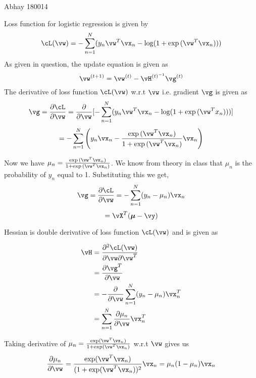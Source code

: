 \documentclass[a4paper,11pt]{article}
\begin{document}
{Abhay}   %
{180014}	%

\begin{mlsolution}
Loss function for logistic regression is given by
\[\cL(\vw) = - \sum_{n=1}^{N}(y_n\vw^T\vx_n - \log(1 + \exp{(\vw^T\vx_n)}))  \]
As given in question, the update equation is given as 
\[\vw^{(t+1)}=\vw^{(t)} - \vH^{(t)^{-1}}\vg^{(t)} \]
The derivative of loss function $\cL(\vw)$ w.r.t $\vw$ i.e. gradient $\vg$ is given as
\[\vg= \frac{\partial\cL}{\partial\vw}  = \frac{\partial}{\partial \vw} [ - \sum_{n=1}^{N}(y_n\vw^T\vx_n - \log(1 + \exp{(\vw^Tx_n)}))] \]
\[= - \sum_{n=1}^{N} \left( y_n\vx_n - \frac{\exp{(\vw^T\vx_n)}}{1+\exp{(\vw^T\vx_n)}} \vx_n\right)\]

Now we have $\mu_n = \frac{\exp{(\vw^T\vx_n)}}{1+\exp{(\vw^T\vx_n)}} $.  We know from theory in class that $\mu_n$ is the probability of $y_n$ equal to 1. Substituting this we get,
\[\vg = \frac{\partial\cL}{\partial\vw} = - \sum_{n=1}^{N}(y_n-\mu_n)\vx_n\]
\[= \vX^T(\boldsymbol{\mu} - \vy)\]

Hessian is double derivative of loss function $\cL(\vw)$ and is given as 

    
\begin{equation}
\begin{split}
    \vH & = \frac{\partial^2\cL(\vw)}{\partial\vw\partial\vw^T}\\
& = \frac{\partial\vg^T}{\partial\vw}\\
& = -\frac{\partial}{\partial\vw}\sum_{n=1}^{N}(y_n-\mu_n)\vx_n^{T}\\
 & = \sum_{n=1}^{N}\frac{\partial\mu_n}{\partial\vw}\vx_n^{T}
\end{split}
\end{equation}


Taking derivative of $\mu_n = \frac{\exp(\vw^T\vx_n)}{1+\exp(\vw^T\vx_n)} $ w.r.t $\vw$ gives us 
\[\frac{\partial\mu_n}{\partial\vw}= \frac{\exp(\vw^T\vx_n)}{(1+\exp(\vw^T\vx_n))^{2}}\vx_n = \mu_n (1-\mu_n)\vx_n\]


\end{mlsolution}
\end{document}

